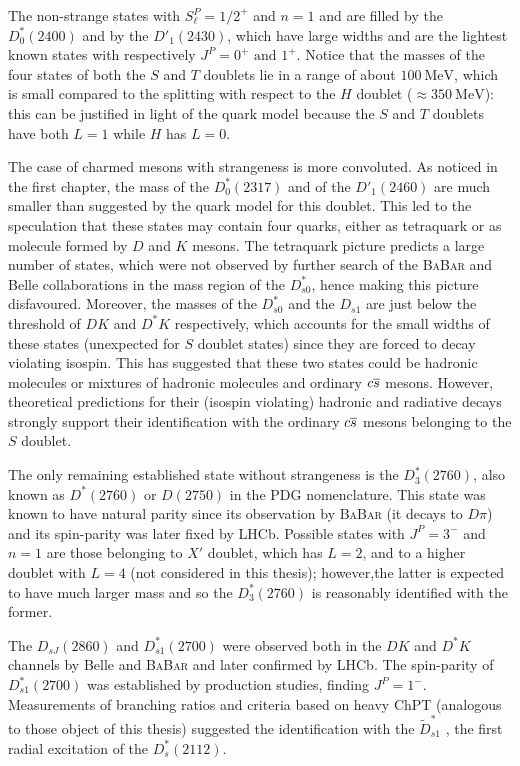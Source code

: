 The non-strange states with $S_\ell^P = \left. 1/2 \right.^+$ and $n = 1$ and are filled by the $D^*_0(2400)$ and by the $D'_1(2430)$, which have large widths and are the lightest known states with respectively $J^P = 0^+ \text{ and } 1^+$. Notice that the masses of the four states of both the $S$ and $T$ doublets lie in a range of about $100 \ \text{MeV}$, which is small compared to the splitting with respect to the $H$ doublet ($\approx 350 \ \text{MeV}$): this can be justified in light of the quark model because the $S$ and $T$ doublets have both $L = 1$ while $H$ has $L = 0$.

The case of charmed mesons with strangeness is more convoluted. As noticed in the first chapter, the mass of the $D^*_0(2317)$ and of the $D'_1(2460)$ are much smaller than suggested by the quark model for this doublet. This led to the speculation that these states may contain four quarks, either as tetraquark or as molecule formed by $D$ and $K$ mesons. The tetraquark picture predicts a large number of states, which were not observed by further search of the \textsc{BaBar} and Belle collaborations in the mass region of the $D^*_{s 0}$, hence making this picture disfavoured. Moreover, the masses of the $D^*_{s 0}$ and the $D_{s 1}$ are just below the threshold of $D K$ and $D^* K$ respectively, which accounts for the small widths of these states (unexpected for $S$ doublet states) since they are forced to decay violating isospin. This has suggested that these two states could be hadronic molecules or mixtures of hadronic molecules and ordinary $c \overline{s}$ mesons. However, theoretical predictions for their (isospin violating) hadronic and radiative decays \cite{Colangelo:2003vg,Colangelo:2005hv} strongly support their identification with the ordinary $c \overline{s}$ mesons belonging to the $S$ doublet.

The only remaining established state without strangeness is the $D^*_3(2760)$, also known as $D^*(2760)$ or $D(2750)$ in the PDG nomenclature. This state was known to have natural parity since its observation by \textsc{BaBar} (it decays to $D \pi$) and its spin-parity was later fixed by LHCb. Possible states with $J^P = 3^-$ and $n = 1$ are those belonging to $X'$ doublet, which has $L = 2$, and to a higher doublet with $L = 4$ (not considered in this thesis); however,the latter is expected to have much larger mass and so the $D^*_3(2760)$ is reasonably identified with the former.

The $D_{s J}(2860)$ and $D^*_{s 1}(2700)$ were observed both in the $D K$ and $D^* K$ channels by Belle and \textsc{BaBar} and later confirmed by LHCb. The spin-parity of $D^*_{s 1}(2700)$ was established by production studies, finding $J^P = 1^-$. Measurements of branching ratios and criteria based on heavy ChPT (analogous to those object of this thesis) suggested the identification with the $\tilde{D}^*_{s 1}$ \cite{Colangelo:2007ds}, the first radial excitation of the $D^*_s(2112)$. 

